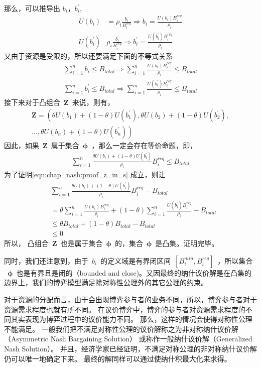 那么，可以推导出 $b_i， b_i^\prime$,
\begin{align*}
    U(b_i) &= \rho_i \frac{b_i}{B_i^{req}} \Rightarrow b_i = \frac{U(b_i)B_i^{req}}{\rho_i} \\
    U(b_i^\prime) & \rho_i \frac{b_i^\prime} {B_i^{req}} \Rightarrow b_i^\prime = \frac{U(b_i^\prime) B_i^{req}}{\rho_i}
\end{align*}
又由于资源是受限的，所以还要满足下面的不等式关系
\begin{align*}
    \sum_{i=1}^n b_i \le B_{total} \Rightarrow \sum_{i=1}^n \frac{U(b_i)B_i^{req}}{\rho_i} \le B_{total}\\
    \sum_{i=1}^n b_i^\prime \le B_{total}\Rightarrow \sum_{i=1}^n \frac{U(b_i^\prime)B_i^{req}}{\rho_i} \le B_{total}
\end{align*}
接下来对于凸组合~$\mathbf{Z}$~来说，则有，
\begin{align*}
    \mathbf{Z} = \left( \theta U(b_1) + (1-\theta) U(b_1^\prime),    \theta U(b_2) + (1-\theta) U(b_2^\prime), \right. \\
    \ldots,  \left. \theta U(b_n) + (1-\theta) U(b_n^\prime) \right)
\end{align*}
因此，如果~$\mathbf{Z}$~属于集合~$\mathbf{\phi}$~，那么一定会存在等价命题，即，
\begin{align}
    \sum_{i=1}^{n} \frac{ \theta U(b_i) + (1-\theta) U(b_i^\prime)}{\rho_i} B_i^{req} \le B_{total}
    \label{eqn:chap_nash:proof_z_in_s}
\end{align}
为了证明\eqref{eqn:chap_nash:proof_z_in_s} 成立，则让
\begin{align*}
    &\sum_{i=1}^{n} \frac{ \theta U(b_i) + (1-\theta) U(b_i^\prime)}{\rho_i} B_i^{req} - B_{total} \\
    &= \theta \sum_{i=1}^n \frac{U(b_i)B_i^{req}}{\rho_i} + (1-\theta) \sum_{i=1}^n \frac{U(b_i^\prime)B_i^{req}}{\rho_i} -B_{total} \\
    &\le \theta B_{total} + (1-\theta)B_{total} - B_{total}\\
    & \le 0
\end{align*}
所以，
凸组合~$\mathbf{Z}$~也是属于集合~$\mathbf{\phi}$~的，集合~$\mathbf{\phi}$~是凸集。证明完毕。

同时，我们还注意到，由于~$b_i$~的定义域是有界闭区间~$[B_i^{min},B_i^{req}]$~，所以集合
~$\mathbf{\phi}$~也是有界且是闭的（bounded and close)。又因最终的纳什议价解是在凸集的边界上，我们的博弈模型满足除对称性公理外的其它公理的约束。

对于资源的分配而言，由于会出现博弈参与者的业务不同，所以，博弈参与者对于资源需求程度也就有所不同。
在议价博弈中，博弈的参与者对资源需求程度的不同其实表现为博弈过程中的议价能力不同。
那么，这样的情况会使得对称性公理不能满足。
一般我们把不满足对称性公理的议价解称之为非对称纳什议价解（Asymmetric Nash Bargaining Solution）
或称作一般纳什议价解（Generalized  Nash  Solution）。
并且，经济学家已经证明，不满足对称公理的非对称纳什议价解仍可以唯一地确定下来\cite{Osborne_Rubinstein_1994}。
最终的解同样可以通过使纳什积最大化来求得。

